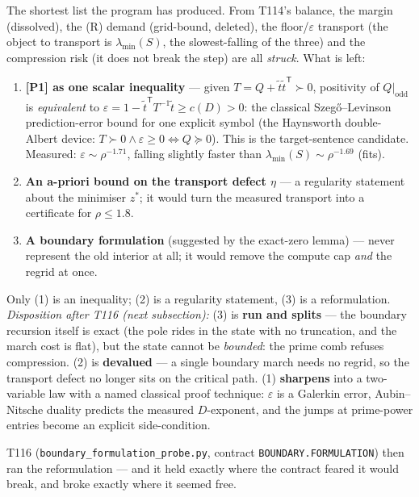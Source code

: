 \documentclass[11pt,a4paper]{article}
\begin{document}
\begin{keybox}
The shortest list the program has produced. From T114's balance, the margin (dissolved), the (R)
demand (grid-bound, deleted), the floor/$\varepsilon$ transport (the object to transport is
$\lambda_{\min}(S)$, the slowest-falling of the three) and the compression risk (it does not
break the step) are all \emph{struck}. What is left:
\begin{enumerate}[leftmargin=1.6em]
\item[\textbf{(1)}] \textbf{[P1] as one scalar inequality} --- given
$T=Q+\tilde t\tilde t^{\mathsf T}\succ0$, positivity of $Q|_{\mathrm{odd}}$ is \emph{equivalent}
to $\varepsilon=1-\tilde t^{\mathsf T}T^{-1}\tilde t\ge c(D)>0$: the classical
Szeg\H{o}--Levinson prediction-error bound for one explicit symbol (the Haynsworth double-Albert
device: $T\succ0\wedge\varepsilon\ge0\iff Q\succeq0$). This is the target-sentence candidate.
Measured: $\varepsilon\sim\rho^{-1.71}$, falling slightly faster than
$\lambda_{\min}(S)\sim\rho^{-1.69}$ (fits).
\item[\textbf{(2)}] \textbf{An a-priori bound on the transport defect $\eta$} --- a regularity
statement about the minimiser $z^*$; it would turn the measured transport into a certificate for
$\rho\le1.8$.
\item[\textbf{(3)}] \textbf{A boundary formulation} (suggested by the exact-zero lemma) ---
never represent the old interior at all; it would remove the compute cap \emph{and} the regrid
at once.
\end{enumerate}
Only (1) is an inequality; (2) is a regularity statement, (3) is a reformulation.\\[3pt]
\emph{Disposition after T116 (next subsection):} (3) is \textbf{run and splits} --- the boundary
recursion itself is exact (the pole rides in the state with no truncation, and the march cost is
flat), but the state cannot be \emph{bounded}: the prime comb refuses compression. (2) is
\textbf{devalued} --- a single boundary march needs no regrid, so the transport defect no longer
sits on the critical path. (1) \textbf{sharpens} into a two-variable law with a named classical
proof technique: $\varepsilon$ is a Galerkin error, Aubin--Nitsche duality predicts the measured
$D$-exponent, and the jumps at prime-power entries become an explicit side-condition.
\end{keybox}

\noindent T116 (\texttt{boundary\_formulation\_probe.py}, contract \texttt{BOUNDARY.FORMULATION})
then ran the reformulation --- and it held exactly where the contract feared it would break,
and broke exactly where it seemed free.
\end{document}
